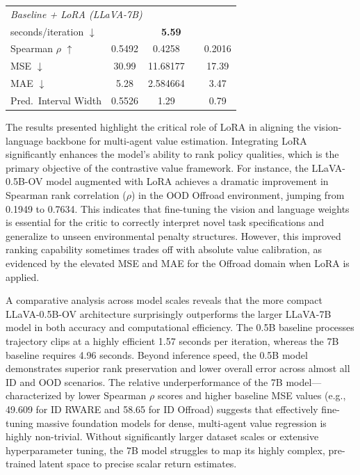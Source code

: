 \documentclass[letterpaper, 10 pt, conference]{ieeeconf}  %
\begin{document}
\begin{table}[ht]
{\begin{tabular}{l|cc|cc}
\midrule
\multicolumn{5}{l}{\textit{Baseline + LoRA (LLaVA-7B)}} \\
\hspace{1em}seconds/iteration $\downarrow$ & \multicolumn{4}{c}{\textbf{5.59}} \\
\hspace{1em}Spearman $\rho$ $\uparrow$ & 0.5492 & 0.4258 & & 0.2016  \\
\hspace{1em}MSE $\downarrow$ & 30.99 & 11.68177 &  & 17.39 \\
\hspace{1em}MAE $\downarrow$ & 5.28 & 2.584664 &  & 3.47 \\
\hspace{1em}Pred.\ Interval Width & 0.5526 & 1.29 &  & 0.79 \\

\bottomrule
\end{tabular}%
}
\end{table}

The results presented highlight the critical role of LoRA in aligning the vision-language backbone for multi-agent value estimation. Integrating LoRA significantly enhances the model's ability to rank policy qualities, which is the primary objective of the contrastive value framework. For instance, the LLaVA-0.5B-OV model augmented with LoRA achieves a dramatic improvement in Spearman rank correlation ($\rho$) in the OOD Offroad environment, jumping from 0.1949 to 0.7634. This indicates that fine-tuning the vision and language weights is essential for the critic to correctly interpret novel task specifications and generalize to unseen environmental penalty structures. However, this improved ranking capability sometimes trades off with absolute value calibration, as evidenced by the elevated MSE and MAE for the Offroad domain when LoRA is applied.

A comparative analysis across model scales reveals that the more compact LLaVA-0.5B-OV architecture surprisingly outperforms the larger LLaVA-7B model in both accuracy and computational efficiency. The 0.5B baseline processes trajectory clips at a highly efficient 1.57 seconds per iteration, whereas the 7B baseline requires 4.96 seconds. Beyond inference speed, the 0.5B model demonstrates superior rank preservation and lower overall error across almost all ID and OOD scenarios. The relative underperformance of the 7B model—characterized by lower Spearman $\rho$ scores and higher baseline MSE values (e.g., 49.609 for ID RWARE and 58.65 for ID Offroad) suggests that effectively fine-tuning massive foundation models for dense, multi-agent value regression is highly non-trivial. Without significantly larger dataset scales or extensive hyperparameter tuning, the 7B model struggles to map its highly complex, pre-trained latent space to precise scalar return estimates.
\end{document}
